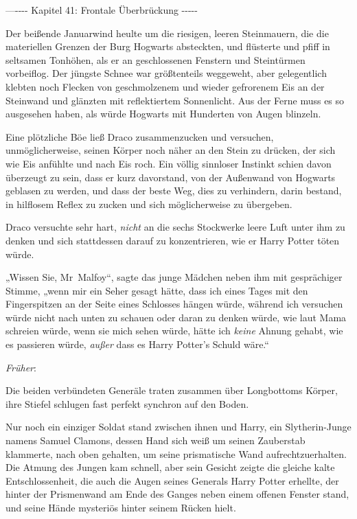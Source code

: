 

\hypertarget{frontale-uxfcberbruxfcckung}{%

—\/-\/-\/-\/- Kapitel 41: Frontale Überbrückung -\/-\/-\/-\/-

Der beißende Januarwind heulte um die riesigen, leeren Steinmauern, die die materiellen Grenzen der Burg Hogwarts absteckten, und flüsterte und pfiff in seltsamen Tonhöhen, als er an geschlossenen Fenstern und Steintürmen vorbeiflog. Der jüngste Schnee war größtenteils weggeweht, aber gelegentlich klebten noch Flecken von geschmolzenem und wieder gefrorenem Eis an der Steinwand und glänzten mit reflektiertem Sonnenlicht. Aus der Ferne muss es so ausgesehen haben, als würde Hogwarts mit Hunderten von Augen blinzeln.

Eine plötzliche Böe ließ Draco zusammenzucken und versuchen, unmöglicherweise, seinen Körper noch näher an den Stein zu drücken, der sich wie Eis anfühlte und nach Eis roch. Ein völlig sinnloser Instinkt schien davon überzeugt zu sein, dass er kurz davorstand, von der Außenwand von Hogwarts geblasen zu werden, und dass der beste Weg, dies zu verhindern, darin bestand, in hilflosem Reflex zu zucken und sich möglicherweise zu übergeben.

Draco versuchte sehr hart, \emph{nicht} an die sechs Stockwerke leere Luft unter ihm zu denken und sich stattdessen darauf zu konzentrieren, wie er Harry Potter töten würde.

„Wissen Sie, Mr~Malfoy“, sagte das junge Mädchen neben ihm mit gesprächiger Stimme, „wenn mir ein Seher gesagt hätte, dass ich eines Tages mit den Fingerspitzen an der Seite eines Schlosses hängen würde, während ich versuchen würde nicht nach unten zu schauen oder daran zu denken würde, wie laut Mama schreien würde, wenn sie mich sehen würde, hätte ich \emph{keine} Ahnung gehabt, wie es passieren würde, \emph{außer} dass es Harry Potter's Schuld wäre.“

\emph{Früher}:

Die beiden verbündeten Generäle traten zusammen über Longbottoms Körper, ihre Stiefel schlugen fast perfekt synchron auf den Boden.

Nur noch ein einziger Soldat stand zwischen ihnen und Harry, ein Slytherin-Junge namens Samuel Clamons, dessen Hand sich weiß um seinen Zauberstab klammerte, nach oben gehalten, um seine prismatische Wand aufrechtzuerhalten. Die Atmung des Jungen kam schnell, aber sein Gesicht zeigte die gleiche kalte Entschlossenheit, die auch die Augen seines Generals Harry Potter erhellte, der hinter der Prismenwand am Ende des Ganges neben einem offenen Fenster stand, und seine Hände mysteriös hinter seinem Rücken hielt.

}
